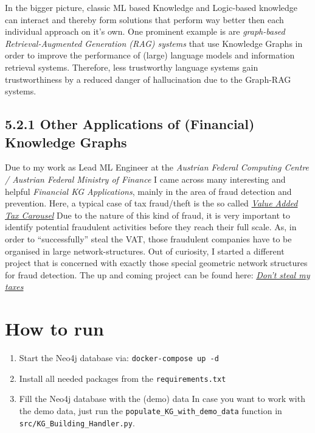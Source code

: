 \documentclass[
]{article}
\providecommand{\tightlist}{%
  \setlength{\itemsep}{0pt}\setlength{\parskip}{0pt}}
\begin{document}
In the bigger picture, classic ML based Knowledge and Logic-based
knowledge can interact and thereby form solutions that perform way
better then each individual approach on it's own. One prominent example
is are \emph{graph-based Retrieval-Augmented Generation (RAG) systems}
that use Knowledge Graphs in order to improve the performance of (large)
language models and information retrieval systems. Therefore, less
trustworthy language systems gain trustworthiness by a reduced danger of
hallucination due to the Graph-RAG systems.

\subsection{5.2.1 Other Applications of (Financial) Knowledge
Graphs}\label{other-applications-of-financial-knowledge-graphs}

Due to my work as Lead ML Engineer at the \emph{Austrian Federal Computing Centre /  Austrian Federal
Ministry of Finance} I came across many interesting and helpful
\emph{Financial KG Applications}, mainly in the area of fraud detection
and prevention. Here, a typical case of tax fraud/theft is the so called \href{https://www.billit.eu/en-int/resources/blog/what-is-a-vat-carousel}{\textit{Value Added Tax Carousel}}
Due to the nature of this kind of fraud, it is very important to
identify potential fraudulent activities before they reach their full
scale. As, in order to ``successfully'' steal the VAT, those fraudulent
companies have to be organised in large network-structures. Out of
curiosity, I started a different project that is concerned with exactly
those special geometric network structures for fraud detection. The up
and coming project can be found here: 
\href{https://github.com/dominik-pichler/Dont\_steal\_my\_taxes}{\textit{Don't steal my taxes}}

\pagebreak
\section{How to run}\label{how-to-use}

\begin{enumerate}
\def\labelenumi{\arabic{enumi}.}
\tightlist
\item
  Start the Neo4j database via:
\texttt{docker{-}compose up {-}d}

\item
  Install all needed packages from the \texttt{requirements.txt}
\item
  Fill the Neo4j database with the (demo) data In case you want to work
  with the demo data, just run the
\texttt{populate\_KG\_with\_demo\_data} function in
  \texttt{src/KG\_Building\_Handler.py}.
\end{enumerate}
\end{document}
